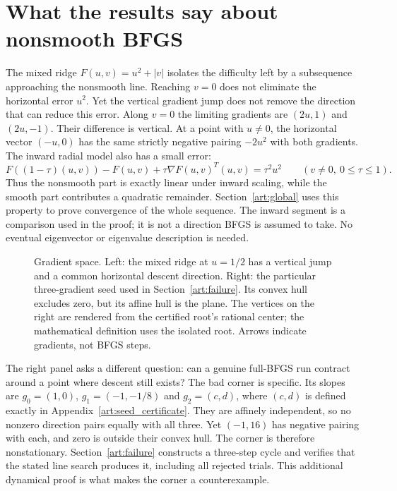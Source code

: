 \section{What the results say about nonsmooth BFGS}\label{art:geometry}

The mixed ridge $F(u,v)=u^2+|v|$ isolates the difficulty left by a
subsequence approaching the nonsmooth line. Reaching $v=0$ does not eliminate
the horizontal error $u^2$. Yet the vertical gradient jump does not remove
the direction that can reduce this error. Along $v=0$ the limiting gradients are $(2u,1)$ and
$(2u,-1)$. Their difference is vertical. At a point with $u\ne0$, the
horizontal vector $(-u,0)$ has the same strictly negative pairing $-2u^2$
with both gradients. The inward radial model also has a small error:
\[
 F((1-\tau)(u,v))-F(u,v)+\tau\nabla F(u,v)^T(u,v)
       =\tau^2u^2\qquad(v\ne0,\ 0\le\tau\le1).
\]
Thus the nonsmooth part is exactly linear under inward scaling, while the
smooth part contributes a quadratic remainder. Section~\ref{art:global}
uses this property to prove convergence of the whole sequence. The inward
segment is a comparison used in the proof; it is not a direction BFGS is
assumed to take. No eventual eigenvector or eigenvalue description is needed.

\begin{figure}[htbp]
\centering

\caption{Gradient space. Left: the mixed ridge at $u=1/2$ has a vertical
jump and a common horizontal descent direction. Right: the particular
three-gradient seed used in Section~\ref{art:failure}. Its convex hull
excludes zero, but its affine hull is the plane. The vertices on the right
are rendered from the certified root's rational center; the mathematical
definition uses the isolated root. Arrows indicate gradients, not BFGS steps.}
\label{art:gradient-geometry}
\end{figure}

The right panel asks a different question: can a genuine full-BFGS run
contract around a point where descent still exists? The bad corner is specific. Its slopes
are $g_0=(1,0)$, $g_1=(-1,-1/8)$ and $g_2=(c,d)$, where $(c,d)$ is
defined exactly in Appendix~\ref{art:seed_certificate}. They are affinely
independent, so no nonzero direction pairs equally with all three. Yet
$(-1,16)$ has negative pairing with each, and zero is outside their convex
hull. The corner is therefore nonstationary. Section~\ref{art:failure}
constructs a three-step cycle and verifies that the stated line search
produces it, including all rejected trials. This additional dynamical proof
is what makes the corner a counterexample.

